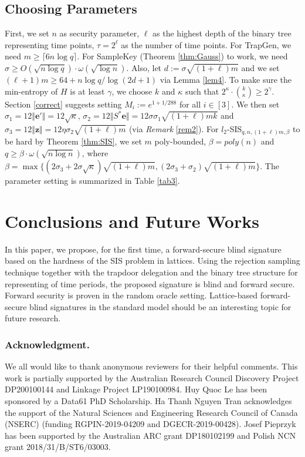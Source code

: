 \documentclass[runningheads]{llncs}
\begin{document}
 \subsection{Choosing Parameters} \label{paraset}
First, we set $n$ as security parameter, $\ell$ as the highest depth of the binary tree representing time points,
$\tau=2^\ell$ as the number of time points.
For \textsf{TrapGen}, we need $m\geq \lceil 6n\log q\rceil$. 
For \textsf{SampleKey} (Theorem \ref{thm:Gauss}) to work, 
we need $\sigma \geq  O(\sqrt{n\log q}) \cdot \omega(\sqrt{\log n})$. 
Also, let $d:=\sigma\sqrt{(1+\ell)m}$ and we set $(\ell+1)m\geq 64+n \log q/\log (2d+1)$ via Lemma \ref{lem4}.
To make sure the min-entropy of $H$ is at least $\gamma$, we choose $k$ 
and $\kappa$ such that $2^{\kappa}\cdot {{k}\choose{\kappa}}  \geq 2^{\gamma} $.
Section \ref{correct} suggests setting $M_i:=e^{1+1/288}$ for all $i \in [3]$. 
We then set $\sigma_1= 12\Vert \mathbf{e}'\Vert=12\sqrt{\kappa}$, $\sigma_2= 12\Vert S^* \mathbf{e}\Vert=12\sigma\sigma_1\sqrt{(1+\ell)mk}$ 
and $\sigma_3= 12\Vert \mathbf{z}\Vert=12\eta\sigma_2\sqrt{(1+\ell)m}$ (via \textit{Remark} \ref{rem2}).
 For $l_2$-\textsf{SIS}$_{q,n,(1+\ell)m,\beta}$ to be hard by Theorem \ref{thm:SIS}, 
 we set  $m$ poly-bounded, $\beta=poly(n)$ and $q \geq \beta \cdot \omega(\sqrt{n\log n})$, where $\beta=\max\{ (2\sigma_3+2\sigma\sqrt{\kappa})\sqrt{(1+\ell)m}, (2\sigma_3+\sigma_2)\sqrt{(1+\ell)m}\}.$ The parameter setting is summarized in Table \ref{tab3}.

\section{Conclusions and Future Works}  \label{conclusion}
%

In this paper, we propose, for the first time, a forward-secure blind signature based on the hardness of the SIS problem in lattices. 
Using the rejection sampling technique together with the trapdoor delegation and the binary tree structure 
for representing of time periods, the proposed signature is blind and forward secure.
Forward security is proven in the random oracle setting. 
Lattice-based forward-secure blind signatures in the standard model should be an interesting topic for future research.

\subsubsection{Acknowledgment.} 
We all would like to thank anonymous reviewers for their helpful comments.  
This work is partially supported by the Australian Research Council Discovery Project DP200100144 and Linkage Project LP190100984.   
Huy Quoc Le has been sponsored by a Data61 PhD Scholarship. 
Ha Thanh Nguyen Tran acknowledges the support of the Natural Sciences and Engineering Research Council of Canada 
(NSERC) (funding RGPIN-2019-04209 and DGECR-2019-00428). 
Josef Pieprzyk has been supported by the Australian ARC grant DP180102199 and Polish NCN grant 2018/31/B/ST6/03003.
%




\iffalse
\appendix 


\fi
\end{document}
